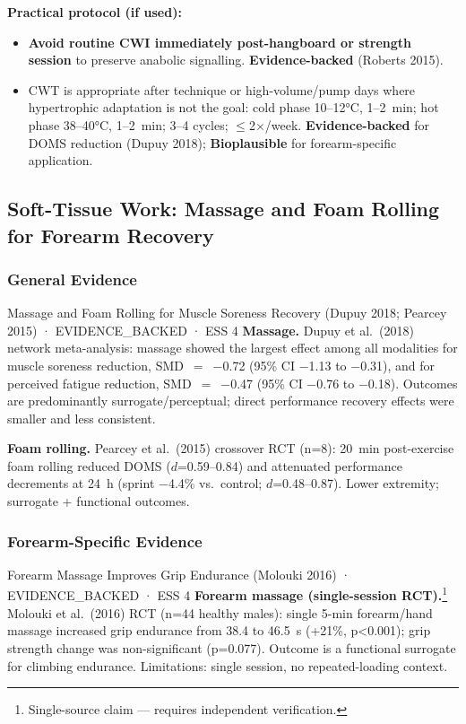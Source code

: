 \textbf{Practical protocol (if used):}
\begin{itemize}[noitemsep]
  \item \textbf{Avoid routine CWI immediately post-hangboard or strength session} to preserve anabolic signalling. \textbf{Evidence-backed} (Roberts 2015).
  \item CWT is appropriate after technique or high-volume/pump days where hypertrophic adaptation is not the goal: cold phase 10--12°C, 1--2~min; hot phase 38--40°C, 1--2~min; 3--4 cycles; $\leq$2$\times$/week. \textbf{Evidence-backed} for DOMS reduction (Dupuy 2018); \textbf{Bioplausible} for forearm-specific application.
\end{itemize}

\subsection{Soft-Tissue Work: Massage and Foam Rolling for Forearm Recovery}

\subsubsection*{General Evidence}

\begin{evidencebox}{Massage and Foam Rolling for Muscle Soreness Recovery (Dupuy 2018; Pearcey 2015) · EVIDENCE\_BACKED · ESS 4}
\textbf{Massage.} Dupuy et al.\ (2018) network meta-analysis: massage showed the largest effect among all modalities for muscle soreness reduction, SMD~$=$~$-$0.72 (95\% CI $-$1.13 to $-$0.31), and for perceived fatigue reduction, SMD~$=$~$-$0.47 (95\% CI $-$0.76 to $-$0.18). Outcomes are predominantly surrogate/perceptual; direct performance recovery effects were smaller and less consistent. \cite{DDTE18}

\textbf{Foam rolling.} Pearcey et al.\ (2015) crossover RCT (n=8): 20~min post-exercise foam rolling reduced DOMS ($d$=0.59--0.84) and attenuated performance decrements at 24~h (sprint $-$4.4\% vs.\ control; $d$=0.48--0.87). Lower extremity; surrogate + functional outcomes. \cite{PBKE15}
\end{evidencebox}

\subsubsection*{Forearm-Specific Evidence}

\begin{evidencebox}{Forearm Massage Improves Grip Endurance (Molouki 2016) · EVIDENCE\_BACKED · ESS 4}
\textbf{Forearm massage (single-session RCT).}\footnote{Single-source claim --- requires independent verification.} Molouki et al.\ (2016) RCT (n=44 healthy males): single 5-min forearm/hand massage increased grip endurance from 38.4 to 46.5~s (+21\%, p<0.001); grip strength change was non-significant (p=0.077). Outcome is a functional surrogate for climbing endurance. Limitations: single session, no repeated-loading context.
\end{evidencebox}

